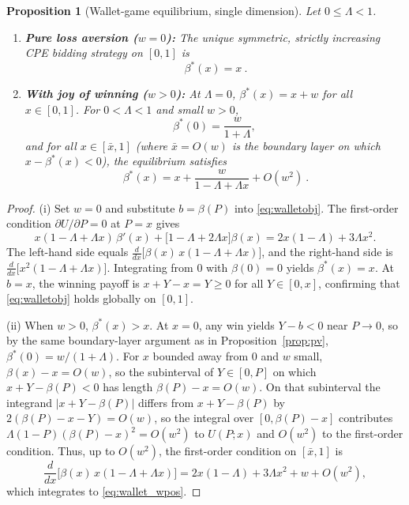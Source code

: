 \documentclass[11pt,a4paper]{article}
\newtheorem{proposition}{Proposition}
\theoremstyle{remark}
\begin{document}
\begin{proposition}[Wallet-game equilibrium, single dimension]
\label{prop:wallet}
Let $0\le\Lambda<1$.
\begin{enumerate}
\item[(i)] \textbf{Pure loss aversion ($w=0$):} The unique symmetric, strictly
increasing CPE bidding strategy on $[0,1]$ is
\begin{equation}
\boxed{\ \beta^{*}(x)=x\ }.
\label{eq:wallet_w0}
\end{equation}
\item[(ii)] \textbf{With joy of winning ($w>0$):} At $\Lambda=0$,
$\beta^*(x)=x+w$ for all $x\in[0,1]$. For $0<\Lambda<1$ and small $w>0$,
\begin{equation}
\beta^{*}(0)=\frac{w}{1+\Lambda},
\end{equation}
and for all $x\in[\bar x,1]$ (where $\bar x=O(w)$ is the boundary layer on which
$x-\beta^*(x)<0$), the equilibrium satisfies
\begin{equation}
\boxed{\ \beta^{*}(x)=x+\frac{w}{1-\Lambda+\Lambda x}+O(w^{2})\ }.
\label{eq:wallet_wpos}
\end{equation}
\end{enumerate}
\end{proposition}

\begin{proof}
(i) Set $w=0$ and substitute $b=\beta(P)$ into \eqref{eq:walletobj}. The first-order
condition $\partial U/\partial P=0$ at $P=x$ gives
\begin{equation}
x(1-\Lambda+\Lambda x)\,\beta'(x)+\big[1-\Lambda+2\Lambda x\big]\beta(x)
=2x(1-\Lambda)+3\Lambda x^{2} .
\end{equation}
The left-hand side equals
$\frac{d}{dx}\big[\beta(x)\,x(1-\Lambda+\Lambda x)\big]$, and the right-hand side is
$\frac{d}{dx}\big[x^{2}(1-\Lambda+\Lambda x)\big]$. Integrating from $0$ with
$\beta(0)=0$ yields $\beta^*(x)=x$. At $b=x$, the winning payoff is $x+Y-x=Y\ge 0$
for all $Y\in[0,x]$, confirming that \eqref{eq:walletobj} holds globally on $[0,1]$.

(ii) When $w>0$, $\beta^*(x)>x$. At $x=0$, any win yields $Y-b<0$ near $P\to 0$, so
by the same boundary-layer argument as in Proposition~\ref{prop:pv},
$\beta^*(0)=w/(1+\Lambda)$. For $x$ bounded away from $0$ and $w$ small,
$\beta(x)-x=O(w)$, so the subinterval of $Y\in[0,P]$ on which $x+Y-\beta(P)<0$ has
length $\beta(P)-x=O(w)$. On that subinterval the integrand $|x+Y-\beta(P)|$ differs
from $x+Y-\beta(P)$ by $2(\beta(P)-x-Y)=O(w)$, so the integral over $[0,\beta(P)-x]$
contributes $\Lambda(1-P)(\beta(P)-x)^2=O(w^2)$ to $U(P;x)$ and $O(w^2)$ to the
first-order condition. Thus, up to $O(w^2)$, the first-order condition on $[\bar x,1]$
is
\begin{equation}
\frac{d}{dx}\Big[\beta(x)\,x(1-\Lambda+\Lambda x)\Big]
=2x(1-\Lambda)+3\Lambda x^{2}+w + O(w^{2}),
\end{equation}
which integrates to \eqref{eq:wallet_wpos}.
\end{proof}
\end{document}

